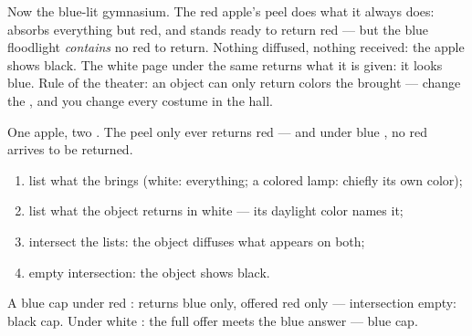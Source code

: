 \begin{example}\label{ex:g8:colors-spectra:gym}
Now the blue-lit gymnasium. The red apple's peel does what it
always does: absorbs everything but red, and stands ready to
return red --- but the blue floodlight \emph{contains} no red
to return. Nothing diffused, nothing received: the apple shows
black. The white page under the same  returns what it is
given: it looks blue. Rule of the theater: an object can only
return colors the  brought --- change the , and you
change every costume in the hall.
\end{example}

\begin{omfigure}

{\small One apple, two . The peel only ever returns red
--- and under blue , no red arrives to be returned.}
\end{omfigure}

\begin{method}\label{met:g8:colors-spectra:predict}
\begin{enumerate}
  \item list what the  brings (white: everything; a
        colored lamp: chiefly its own color);
  \item list what the object returns in white  --- its
        daylight color names it;
  \item intersect the lists: the object diffuses what appears
        on both;
  \item empty intersection: the object shows black.
\end{enumerate}
A blue cap under red : returns blue only, offered red
only --- intersection empty: black cap. Under white : the
full offer meets the blue answer --- blue cap.
\end{method}

